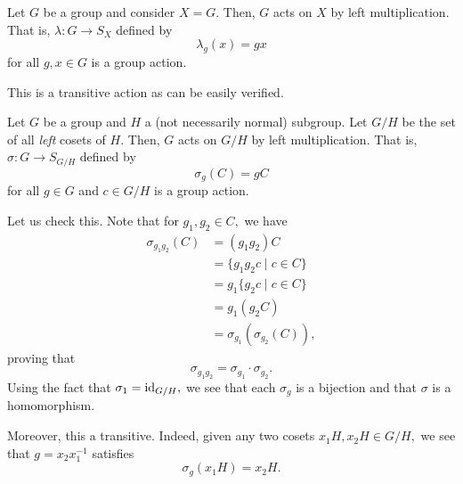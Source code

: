 \begin{ex} \label{ex:regularaction}
	Let $G$ be a group and consider $X = G.$ Then, $G$ acts on $X$ by left multiplication. That is, $\lambda : G \to S_X$ defined by
	\begin{equation*} 
		\lambda_g(x) = gx
	\end{equation*}
	for all $g, x \in G$ is a group action.

	This is a transitive action as can be easily verified.
\end{ex}


\begin{ex} \label{ex:cosetaction}
	Let $G$ be a group and $H$ a (not necessarily normal) subgroup. Let $G/H$ be the set of all \emph{left} cosets of $H.$ Then, $G$ acts on $G/H$ by left multiplication. That is, $\sigma : G \to S_{G/H}$ defined by
	\begin{equation*} 
		\sigma_g(C) = gC
	\end{equation*}
	for all $g \in G$ and $c \in G/H$ is a group action.

	Let us check this. Note that for $g_1, g_2 \in C,$ we have
	\begin{align*} 
		\sigma_{g_1g_2}(C) &= (g_1g_2)C\\
		&= \{g_1g_2c \mid c \in C\}\\
		&= g_1\{g_2c \mid c \in C\}\\
		&= g_1 (g_2 C)\\
		&= \sigma_{g_1}(\sigma_{g_2}(C)),
	\end{align*}
	proving that
	\begin{equation*} 
		\sigma_{g_1g_2} = \sigma_{g_1} \cdot \sigma_{g_2}.
	\end{equation*}
	Using the fact that $\sigma_1 = \operatorname{id}_{G/H},$ we see that each $\sigma_g$ is a bijection and that $\sigma$ is a homomorphism.

	Moreover, this a transitive. Indeed, given any two cosets $x_1H, x_2H \in G/H,$ we see that $g = x_2x_1^{-1}$ satisfies
	\begin{equation*} 
		\sigma_g(x_1H) = x_2H. 
	\end{equation*}
\end{ex}

